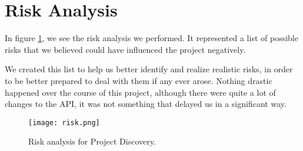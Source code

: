 \section{Risk Analysis}\label{sec:riskanalysis}

In figure \ref{fig:risk}, we see the risk analysis we performed. It represented a list of possible risks that we believed could have influenced the project negatively. 

We created this list to help us better identify and realize realistic risks, in order to be better prepared to deal with them if any ever arose. Nothing drastic happened over the course of this project, although there were quite a lot of changes to the API, it was not something that delayed us in a significant way.

\begin{figure}[H]
\centering
\graphicspath{ {./graphics/} }
\centerline{\texttt{[image: risk.png]}}
\caption{\label{fig:risk} Risk analysis for Project Discovery.}
\end{figure}
